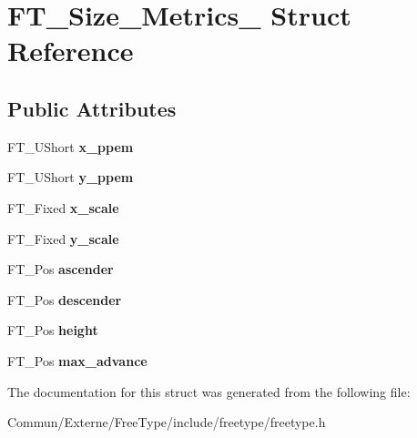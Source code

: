 \hypertarget{struct_f_t___size___metrics__}{}\section{F\+T\+\_\+\+Size\+\_\+\+Metrics\+\_\+ Struct Reference}
\label{struct_f_t___size___metrics__}
\subsection*{Public Attributes}
\begin{DoxyCompactItemize}
\item 
F\+T\+\_\+\+U\+Short {\bfseries x\+\_\+ppem}\hypertarget{struct_f_t___size___metrics___abb42b175a3450e9d8b84483f166d6c8a}{}\label{struct_f_t___size___metrics___abb42b175a3450e9d8b84483f166d6c8a}

\item 
F\+T\+\_\+\+U\+Short {\bfseries y\+\_\+ppem}\hypertarget{struct_f_t___size___metrics___abcdb70cb9e39a74679bc39c07f3275f7}{}\label{struct_f_t___size___metrics___abcdb70cb9e39a74679bc39c07f3275f7}

\item 
F\+T\+\_\+\+Fixed {\bfseries x\+\_\+scale}\hypertarget{struct_f_t___size___metrics___a5e92028bb9881e107a6fb75d557eaff1}{}\label{struct_f_t___size___metrics___a5e92028bb9881e107a6fb75d557eaff1}

\item 
F\+T\+\_\+\+Fixed {\bfseries y\+\_\+scale}\hypertarget{struct_f_t___size___metrics___a1f8b1cb3538b9920127f721dd061379d}{}\label{struct_f_t___size___metrics___a1f8b1cb3538b9920127f721dd061379d}

\item 
F\+T\+\_\+\+Pos {\bfseries ascender}\hypertarget{struct_f_t___size___metrics___ab5fde60a2661d7b774f61c264a2a6070}{}\label{struct_f_t___size___metrics___ab5fde60a2661d7b774f61c264a2a6070}

\item 
F\+T\+\_\+\+Pos {\bfseries descender}\hypertarget{struct_f_t___size___metrics___a9b2ca3a4391803e8721ed99eb9953d52}{}\label{struct_f_t___size___metrics___a9b2ca3a4391803e8721ed99eb9953d52}

\item 
F\+T\+\_\+\+Pos {\bfseries height}\hypertarget{struct_f_t___size___metrics___ae3361e264fb8a9e669f118bdb244439b}{}\label{struct_f_t___size___metrics___ae3361e264fb8a9e669f118bdb244439b}

\item 
F\+T\+\_\+\+Pos {\bfseries max\+\_\+advance}\hypertarget{struct_f_t___size___metrics___ac315a7a834ac1a57c7169ce021718958}{}\label{struct_f_t___size___metrics___ac315a7a834ac1a57c7169ce021718958}

\end{DoxyCompactItemize}


The documentation for this struct was generated from the following file\+:\begin{DoxyCompactItemize}
\item 
Commun/\+Externe/\+Free\+Type/include/freetype/freetype.\+h\end{DoxyCompactItemize}
